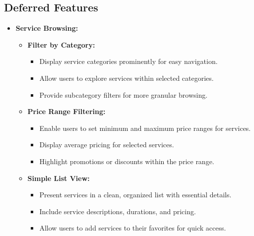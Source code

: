 \subsection{Deferred Features}
\begin{itemize}[leftmargin=*]
    \item \textbf{Service Browsing:}
    \begin{itemize}
        \item \textbf{Filter by Category:}
        \begin{itemize}
            \item Display service categories prominently for easy navigation.
            \item Allow users to explore services within selected categories.
            \item Provide subcategory filters for more granular browsing.
        \end{itemize}
        
        \item \textbf{Price Range Filtering:}
        \begin{itemize}
            \item Enable users to set minimum and maximum price ranges for services.
            \item Display average pricing for selected services.
            \item Highlight promotions or discounts within the price range.
        \end{itemize}
        
        \item \textbf{Simple List View:}
        \begin{itemize}
            \item Present services in a clean, organized list with essential details.
            \item Include service descriptions, durations, and pricing.
            \item Allow users to add services to their favorites for quick access.
        \end{itemize}
    \end{itemize}
\end{itemize}

